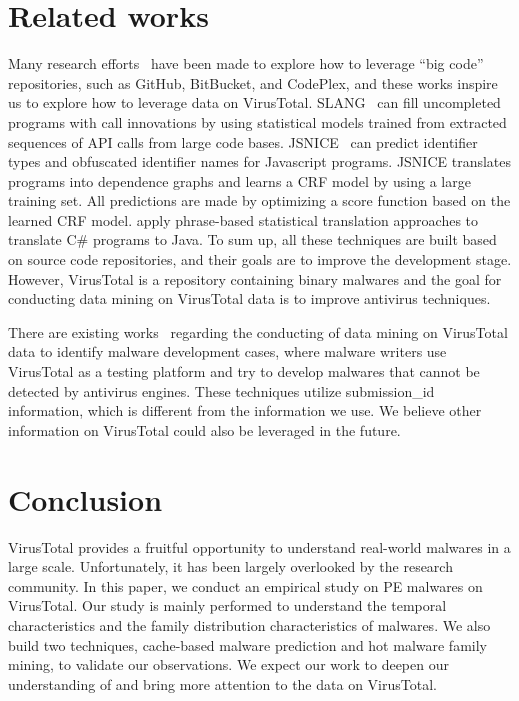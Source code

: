 \section{Related works}

Many research efforts~\cite{bigcode, big-lessons,big-translation,code-completion,big-predicting} 
have been made to explore how to leverage ``big code'' repositories, 
such as GitHub, BitBucket, and CodePlex, and these works inspire us to explore how to leverage data on VirusTotal. 
SLANG~\cite{code-completion} can fill uncompleted programs with call innovations 
by using statistical models trained from extracted sequences of API calls from large code bases.  
JSNICE~\cite{big-predicting} can predict identifier types and obfuscated identifier names for Javascript programs. 
JSNICE translates programs into dependence graphs and learns a CRF model by using a large training set. 
All predictions are made by optimizing a score function based on the learned CRF model. 
\citet{big-translation} apply phrase-based statistical translation approaches to translate C\# programs to Java.
To sum up, all these techniques are built based on source code repositories, 
and their goals are to improve the development stage. 
However, VirusTotal is a repository containing binary malwares
and the goal for conducting data mining on VirusTotal data is to improve antivirus techniques. 

There are existing works~\cite{hacker-vt,neeles} regarding the conducting of data mining on VirusTotal data to identify malware development cases, 
where malware writers use VirusTotal as a testing platform and 
try to develop malwares that cannot be detected by antivirus engines. 
These techniques utilize submission\_id information, which is different from the information we use. 
We believe other information on VirusTotal could also be leveraged in the future. 


\section{Conclusion}
VirusTotal provides a fruitful opportunity to understand real-world malwares in a large scale.
Unfortunately, it has been largely overlooked by the research community. 
In this paper, we conduct an empirical study on PE malwares on VirusTotal. 
Our study is mainly performed to understand the temporal characteristics and
the family distribution characteristics of malwares. We also build two techniques, 
cache-based malware prediction and hot malware family mining, to validate our observations. 
We expect our work to deepen our understanding of and bring more attention to the data on VirusTotal. 

